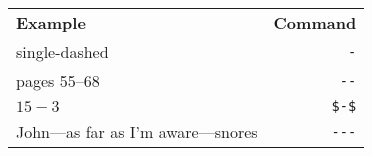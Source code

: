 \documentclass[varwidth,crop]{standalone}
\begin{document}
\begin{tabular}{lr}
    \textbf{Example} & \textbf{Command}\\
    single-dashed & \verb|-|\\
    pages 55--68 & \verb|--|\\
    $15 - 3$ & \verb|$-$|\\
    John---as far as I'm aware---snores & \verb|---|\\
\end{tabular}
\end{document}

